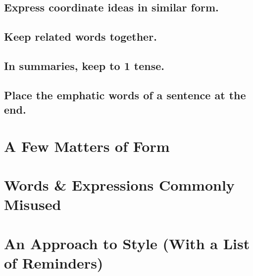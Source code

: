 \documentclass{article}
\numberwithin{equation}{section}
\begin{document}

\subsection{Express coordinate ideas in similar form.}


\subsection{Keep related words together.}


\subsection{In summaries, keep to 1 tense.}


\subsection{Place the emphatic words of a sentence at the end.}


\section{A Few Matters of Form}


\section{Words \& Expressions Commonly Misused}


\section{An Approach to Style (With a List of Reminders)}
\end{document}
